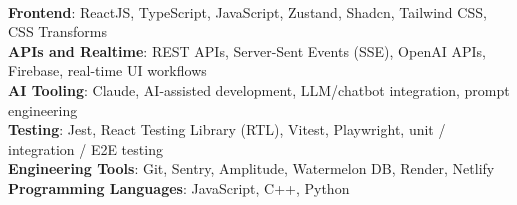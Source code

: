 \\
\textbf{Frontend}: ReactJS, TypeScript, JavaScript, Zustand, Shadcn, Tailwind CSS, CSS Transforms \\\vspace{0.3mm}
\textbf{APIs and Realtime}: REST APIs, Server-Sent Events (SSE), OpenAI APIs, Firebase, real-time UI workflows \\\vspace{0.3mm}
\textbf{AI Tooling}: Claude, AI-assisted development, LLM/chatbot integration, prompt engineering \\\vspace{0.3mm}
\textbf{Testing}: Jest, React Testing Library (RTL), Vitest, Playwright, unit / integration / E2E testing \\\vspace{0.3mm}
\textbf{Engineering Tools}: Git, Sentry, Amplitude, Watermelon DB, Render, Netlify \\\vspace{0.3mm}
\textbf{Programming Languages}: JavaScript, C++, Python
